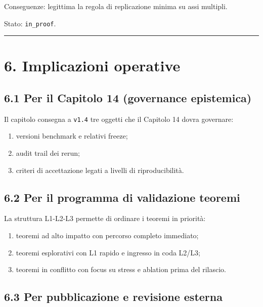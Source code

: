 Conseguenze:
legittima la regola di replicazione minima su assi multipli.

Stato: \texttt{in\_proof}.

\begin{center}\rule{0.5\linewidth}{0.5pt}\end{center}

\section{6. Implicazioni operative}

\subsection{6.1 Per il Capitolo 14 (governance epistemica)}

Il capitolo consegna a \texttt{v1.4} tre oggetti che il Capitolo 14 dovra governare:

\begin{enumerate}
\def\labelenumi{\arabic{enumi}.}
\tightlist
\item
  versioni benchmark e relativi freeze;
\item
  audit trail dei rerun;
\item
  criteri di accettazione legati a livelli di riproducibilità.
\end{enumerate}

\subsection{6.2 Per il programma di validazione teoremi}

La struttura L1-L2-L3 permette di ordinare i teoremi in priorità:

\begin{enumerate}
\def\labelenumi{\arabic{enumi}.}
\tightlist
\item
  teoremi ad alto impatto con percorso completo immediato;
\item
  teoremi esplorativi con L1 rapido e ingresso in coda L2/L3;
\item
  teoremi in conflitto con focus su stress e ablation prima del rilascio.
\end{enumerate}

\subsection{6.3 Per pubblicazione e revisione esterna}

